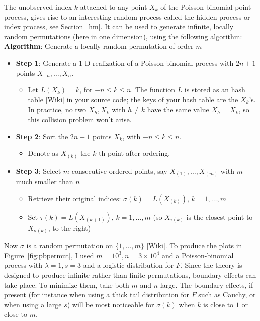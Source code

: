 \documentclass[10pt]{article}
\begin{document}
The unobserved \textcolor{index}{index} $k$ attached to any point $X_k$ of the Poisson-binomial point process, gives rise to an interesting random process called the 
\textcolor{index}{hidden process}
 or \textcolor{index}{index process}, see Section~\ref{hm}. It can be used to generate infinite, locally random permutations (here in one dimension), using the following algorithm: \vspace{1ex}\\
{\bf Algorithm}: Generate a locally random permutation of order $m$
\begin{itemize}
\item {\bf Step 1}: Generate a 1-D realization of a Poisson-binomial process with $2n+1$ points $X_{-n},\dots,X_n$.

\begin{itemize}
\item Let $L(X_k)=k$, for $-n\leq k \leq n$. The function $L$ is stored as an 
\textcolor{index}{hash table} [\href{https://en.wikipedia.org/wiki/Hash_table}{Wiki}] in your source code; the keys of your hash table are the $X_k$'s. In practice, no two $X_h, X_k$ with $h\neq k$ have the same value $X_h=X_k$, so this collision problem won't arise. 
\end{itemize}

\item {\bf Step 2}: Sort the $2n+1$ points $X_k$, with $-n\leq k\leq n$. 
\begin{itemize} 
\item Denote as $X_{(k)}$ the $k$-th point after ordering. 
\end{itemize}

\item {\bf Step 3}: Select $m$ consecutive ordered points, say $X_{(1)},\dots,X_{(m)}$ with $m$ much smaller than $n$
\begin{itemize}
\item Retrieve their original indices: $\sigma(k)=L(X_{(k)})$, $k=1,\dots,m$
\item Set $\tau(k)=L(X_{(k+1)})$, $k=1,\dots,m$ (so $X_{\tau(k)}$ is the closest point to $X_{\sigma(k)}$, to the right)
\end{itemize}
\end{itemize}
Now $\sigma$ is a  \textcolor{index}{random permutation} on $\{1,\dots,m\}$ 
 [\href{https://en.wikipedia.org/wiki/Random_permutation}{Wiki}]. To produce the plots in Figure~\ref{fig:pbpermut}, I used $m=10^3, n=3\times 10^4$ and a Poisson-binomial process with $\lambda=1,s=3$ and a logistic distribution for $F$. Since the theory is designed to produce infinite rather than finite permutations, 
\textcolor{index}{boundary effects} can take place. To minimize them, take both $m$ and $n$ large. The boundary effects, if present (for instance when using a thick tail distribution for $F$ such as Cauchy, or when using a large $s$)  will be most noticeable  for $\sigma(k)$  when $k$ is close to $1$ or close to $m$. 
\end{document}
